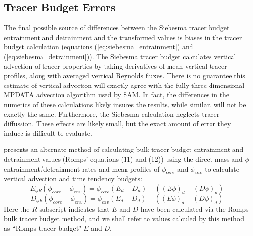 \documentclass[12pt]{article}
\begin{document}

\subsection{Tracer Budget Errors}

The final possible source of differences between the Siebesma tracer 
budget entrainment and detrainment and the transformed values is biases
in the tracer budget calculation (equations (\ref{eq:siebesma_entrainment})
and (\ref{eq:siebesma_detrainment})).  The Siebesma tracer budget calculates 
vertical advection of tracer properties by taking derivatives of mean 
vertical tracer profiles, along with averaged vertical Reynolds fluxes.  
There is no guarantee this estimate of vertical advection will exactly 
agree with the fully three dimensional MPDATA advection algorithm used by 
SAM.  In fact, the differences in the numerics of these calculations 
likely insures the results, while similar, will not be exactly the 
same.  Furthermore, the Siebesma calculation neglects tracer diffussion.  
These effects are likely small, but the exact amount of error they 
induce is difficult to evaluate.

\cite{Romps2010} presents an alternate method of calculating bulk tracer
budget entrainment and detrainment values (Romps' equations (11) and (12))
using the direct mass and $\phi$ entrainment/detrainment rates and mean 
profiles of $\phi_{core}$ and $\phi_{env}$ to calculate vertical advection 
and time tendency budgets:
\begin{equation}
  \label{eq:romps_bulk_entrainment}
    E_{\phi R}(\phi_{core} - \phi_{env}) = \phi_{core}(E_d-D_d) - ((E\phi)_d - (D\phi)_d)
\end{equation}
\begin{equation}
  \label{eq:romps_bulk_detrainment}
    D_{\phi R}(\phi_{core} - \phi_{env}) = \phi_{env}(E_d-D_d) - ((E\phi)_d - (D\phi)_d)
\end{equation}
Here the $R$ subscript indicates that $E$ and $D$ have been calculated via 
the Romps bulk tracer budget method, and we shall refer to values calculed 
by this method as ``Romps tracer budget" $E$ and $D$.
\end{document}
